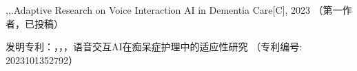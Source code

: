 



\begin{enumerate}[label={[\arabic*]}]
\item {},,.Adaptive Research on Voice Interaction AI in Dementia Care[C], 2023 （第一作者，已投稿）
\end{enumerate}


\begin{enumerate}[label={[\arabic*]}, noitemsep]
\item 发明专利：，，，语音交互AI在痴呆症护理中的适应性研究 （专利编号: 2023101352792）
\end{enumerate}

